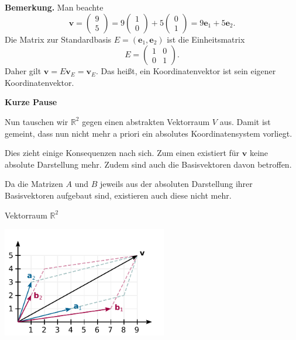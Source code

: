 \documentclass[9pt]{beamer}
\newcommand{\bv}[1]{\mathbf{#1}}
\newcommand{\R}{\mathbb R}
\newcommand{\strong}[1]{\textsf{\textbf{#1}}}
\newcommand{\parspace}{\vspace{0.8em}}
\newcommand{\basis}[1]{#1}
\begin{document}
\begin{frame}
\strong{Bemerkung.} Man beachte
\[\bv v = \begin{pmatrix}9\\ 5\end{pmatrix} = 
9\begin{pmatrix}1\\ 0\end{pmatrix} + 5\begin{pmatrix}0\\ 1\end{pmatrix}
= 9\bv e_1 + 5\bv e_2.\]\pause
Die Matrix zur Standardbasis $\basis E=(\bv e_1,\bv e_2)$
ist die Einheitsmatrix
\[E=\begin{pmatrix}1 & 0\\ 0 & 1\end{pmatrix}.
\]\pause
Daher gilt $\bv v = E\bv v_{\basis E} = \bv v_{\basis E}$. Das heißt,
ein Koordinatenvektor ist sein eigener Koordinatenvektor. 
\end{frame}

\begin{frame}
\begin{center}
\strong{Kurze Pause}
\end{center}
\end{frame}

\begin{frame}
Nun tauschen wir $\R^2$ gegen einen abstrakten Vektorraum $V$ aus.
Damit ist gemeint, dass nun nicht mehr a priori ein absolutes
Koordinatensystem vorliegt.\pause

\parspace
Dies zieht einige Konsequenzen nach sich. Zum einen existiert für
$\bv v$ keine absolute Darstellung mehr. Zudem sind auch die
Basisvektoren davon betroffen.\pause

\parspace
Da die Matrizen $A$ und $B$ jeweils aus der absoluten Darstellung
ihrer Basisvektoren aufgebaut sind, existieren auch diese nicht mehr.
\end{frame}

\begin{frame}
\begin{center}Vektorraum $\R^2$\end{center}

\vspace{-2em}
\begin{center}
\includegraphics[width=72mm]{img/Vektor-in-Basis-AB.pdf}
\end{center}
\end{frame}
\end{document}
